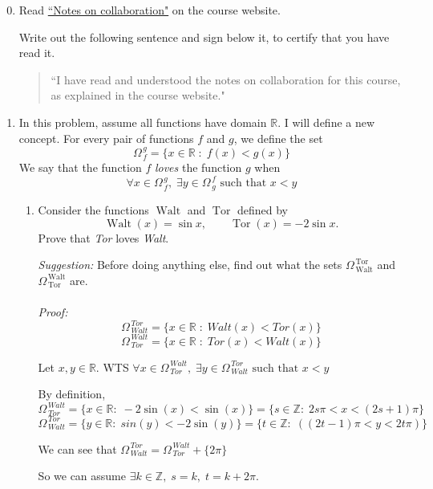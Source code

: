 \documentclass[12pt]{exam}
\newcommand{\vv}{\vspace{.2cm}}
\newcommand{\R}{\mathbb{R}}
\newcommand{\Z}{\mathbb{Z}}
\newcommand{\M}[2]{\Omega^{\, #2}_{\, #1}}
\DeclareMathOperator{\Walt}{Walt}
\DeclareMathOperator{\Tor}{Tor}
\begin{document}
\begin{enumerate}

\setcounter{enumi}{-1}

\item Read \href{https://www.math.toronto.edu/~alfonso/137/PS/137_2021_collaboration.pdf}{``Notes on collaboration"} on the course website.

	Write out the following sentence and sign below it, to certify that you have read it.
	
	\begin{quote}
		``I have read and understood the notes on collaboration for this course, as explained in the course website."
	\end{quote}

\vv
\newpage

\item  \label{likes}  In this problem, assume all functions have domain $\R$.  I will define a new concept.  For every pair of functions $f$ and $g$, we define the set
	$$
		\M{f}{g} = \{x \in \R \; : \; f(x) < g(x) \}
	$$ 
	We say that the function $f$ \emph{loves} the function $g$ when
	$$
		\forall x \in \M{f}{g}, \; \exists y \in \M{g}{f} \mbox{ such that } x < y
	$$

	\begin{enumerate}
		\item  Consider the functions $\Walt$ and $\Tor$ defined by
			$$
				\Walt(x) = \sin x, \quad \quad \Tor(x) = - 2\sin x.
			$$
		Prove that \emph{Tor} loves \emph{Walt}.
		
		\vv
		\emph{Suggestion:}  Before doing anything else, find out what the sets $\M{\Walt}{\Tor}$ and $\M{\Tor}{\Walt}$ are.\\
		\\
		\emph{Proof:}
		$$
		    \M{Walt}{Tor}=\{x \in \R \; : \; Walt(x) < Tor(x) \}
		$$
		$$
		    \M{Tor}{Walt}=\{x \in \R \; : \; Tor(x) < Walt(x) \}
		$$

		Let $x, y \in \R$. WTS $\forall x \in \M{Tor}{Walt}, \; \exists y \in \M{Walt}{Tor} \mbox{ such that } x < y$\\
		\vv
		
		By definition, 
		$$ 
			\M{Tor}{Walt} = \{x \in \R : \; - 2\sin(x) < \sin(x) \} = \{s \in \Z : \; 2s\pi < x < (2s + 1)\pi\}
		$$
		$$ 
			\M{Walt}{Tor} = \{y \in \R : \; sin(y) < - 2\sin(y) \} = \{t \in \Z: \; ((2t - 1)\pi < y < 2t\pi)\}
		$$

		We can see that $\M{Walt}{Tor}=\M{Tor}{Walt} + \{2\pi\}$

		So we can assume $\exists k \in \Z, \; s = k, \; t = k + 2\pi$.\\


\end{enumerate}
\end{enumerate}
\end{document}
